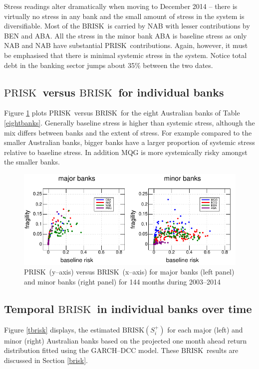 \documentclass[authoryear]{elsarticle}
\newcommand{\sref}[1]{Section \ref{#1}}
\newcommand{\fref}[1]{Figure \ref{#1}}
\newcommand{\tref}[1]{Table \ref{#1}}
\newcommand{\br}{\ensuremath{\mathrm{BRISK}}}
\newcommand{\pr}{\ensuremath{\mathrm{PRISK}}}
\begin{document}
Stress readings  alter dramatically when moving to December 2014 -- there is virtually no stress in any bank and the small amount of  stress in the system is diversifiable.    Most of the  \br\ is carried by NAB with lesser contributions by BEN and ABA.    All the stress in the minor bank ABA is baseline stress as only NAB and NAB have substantial \pr\  contributions.   Again, however, it must be emphasised that there is minimal systemic stress in the system.  Notice total debt in the banking sector  jumps about 35\% between the two dates.

\subsection{\pr\ versus \br\  for individual banks}

\fref{sysstress} plots \pr\ versus \br\ for the eight Australian banks of \tref{eightbanks}.   Generally baseline stress is higher than systemic stress, although the mix differs between banks and the extent of stress. For example compared to the smaller Australian banks, bigger banks have a larger proportion of systemic stress relative to baseline stress. In addition MQG is more systemically risky amongst the smaller banks.

\begin{figure}[htbp]
\begin{center}
\includegraphics[width=12cm]{figures/sysstress.pdf}
\caption{\pr\  (y--axis) versus \br\  (x--axis)   for major banks (left panel) and  minor banks (right panel)  for 144 months during 2003--2014}
\label{sysstress}
\end{center}
\end{figure}

\subsection{Temporal \br\ in individual banks over time}\label{simulate1}

\fref{tbrisk} displays, the estimated $\br(S_i^+)$   for each major (left) and minor (right) Australian banks based on the projected one month ahead return distribution fitted using the GARCH--DCC model.   These \br\ results are discussed in \sref{brisk}.
\end{document}
